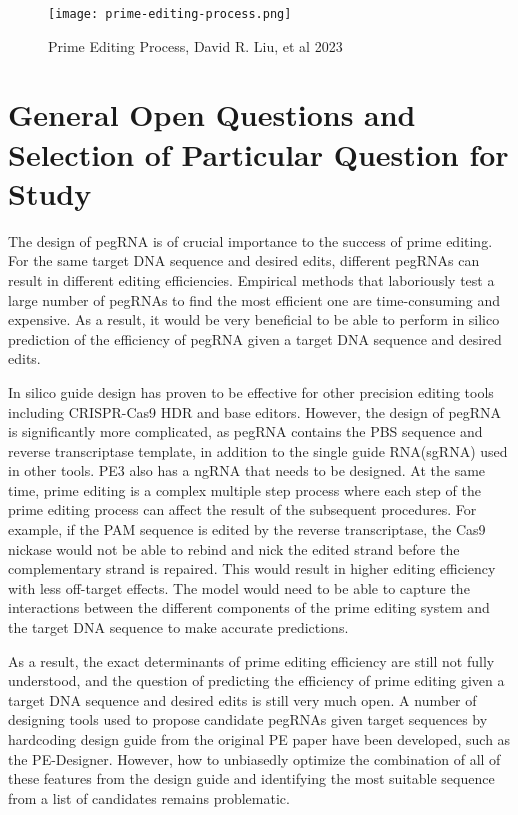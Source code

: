 \documentclass[12pt]{article}
\begin{document}
\begin{figure}[ht]
    \centering
    \texttt{[image: prime-editing-process.png]}
    \caption{Prime Editing Process, David R. Liu, et al 2023}
    \label{fig:prime-editing}
\end{figure}

\section{General Open Questions and Selection of Particular Question for Study}

The design of pegRNA is of crucial importance to the success of prime editing. For the same target DNA sequence and desired edits, different pegRNAs can result in different editing efficiencies. Empirical methods that laboriously test a large number of pegRNAs to find the most efficient one  are time-consuming and expensive. As a result, it would be very beneficial to be able to perform in silico prediction of the efficiency of pegRNA given a target DNA sequence and desired edits. 

In silico guide design has proven to be effective for other precision editing tools including CRISPR-Cas9 HDR and base editors\cite{chenGenomewideCRISPROfftarget2023,marquartPredictingBaseEditing2021}. However, the design of pegRNA is significantly more complicated, as pegRNA contains the PBS sequence and reverse transcriptase template, in addition to the single guide RNA(sgRNA) used in other tools. PE3 also has a ngRNA that needs to be designed. At the same time, prime editing is a complex multiple step process where each step of the prime editing process can affect the result of the subsequent procedures. For example, if the PAM sequence is edited by the reverse transcriptase, the Cas9 nickase would not be able to rebind and nick the edited strand before the complementary strand is repaired. This would result in higher editing efficiency with less off-target effects. The model would need to be able to capture the interactions between the different components of the prime editing system and the target DNA sequence to make accurate predictions.

As a result, the exact determinants of prime editing efficiency are still not fully understood, and the question of predicting the efficiency of prime editing given a target DNA sequence and desired edits is still very much open. A number of designing tools used to propose candidate pegRNAs given target sequences by hardcoding design guide from the original PE paper have been developed, such as the PE-Designer\cite{hwangPEDesignerPEAnalyzerWebbased2021}. However, how to unbiasedly optimize the combination of all of these features from the design guide and identifying the most suitable sequence from a list of candidates remains problematic.
\end{document}
